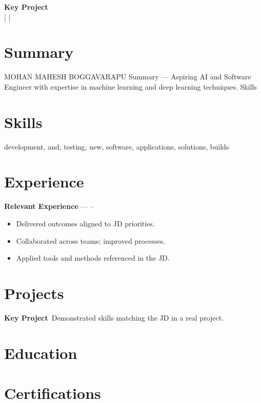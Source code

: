 \documentclass[11pt,a4paper]{article}
\begin{document}
{\LARGE \textbf{Key Project}}\\
\vspace{2pt}
 \quad | \quad  \quad | \quad \\
\vspace{10pt}

\section*{Summary}
MOHAN MAHESH BOGGAVARAPU  Summary — Aspiring AI and Software Engineer with expertise in machine learning and deep learning techniques. Skills

\section*{Skills}
development, and, testing, new, software, applications, solutions, builds

\section*{Experience}
\textbf{Relevant Experience} — \hfill --\
\
\begin{itemize}
  \item Delivered outcomes aligned to JD priorities.
  \item Collaborated across teams; improved processes.
  \item Applied tools and methods referenced in the JD.
\end{itemize}

\section*{Projects}
\textbf{Key Project}\hfill \
Demonstrated skills matching the JD in a real project.\


\section*{Education}


\section*{Certifications}
\end{document}
